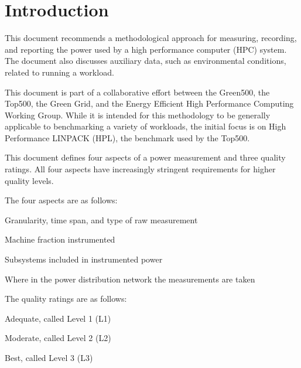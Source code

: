 \chapter{Introduction}
\label{sec:intro}

\noindent
This document recommends a methodological approach for measuring, recording, and reporting the power used by a high performance 
computer (HPC) system. The document also discusses auxiliary data, such as environmental conditions, related to 
running a workload. 
\wl

\noindent
This document is part of a collaborative effort between the Green500, the Top500, 
the Green Grid, and the Energy Efficient High Performance Computing Working Group.  While 
it is intended for this methodology to be generally applicable to benchmarking a variety of 
workloads, the initial focus is on High Performance LINPACK (HPL), the benchmark used by the Top500. 
\wl

\noindent
This document defines four aspects of a power measurement and three quality ratings. All 
four aspects have increasingly stringent requirements for higher quality levels.  
\wl

\noindent
The four aspects are as follows:


\begin{packed_enum}
\item 
Granularity, time span, and type of raw measurement
\item 
Machine fraction instrumented
\item 
Subsystems included in instrumented power
\item 
Where in the power distribution network the measurements are taken
\end{packed_enum}

The quality ratings are as follows:

\begin{packed_item}
\item 
Adequate, called Level 1 (L1)
\item
Moderate, called Level 2 (L2)
\item
Best, called Level 3 (L3)
\end{packed_item}

